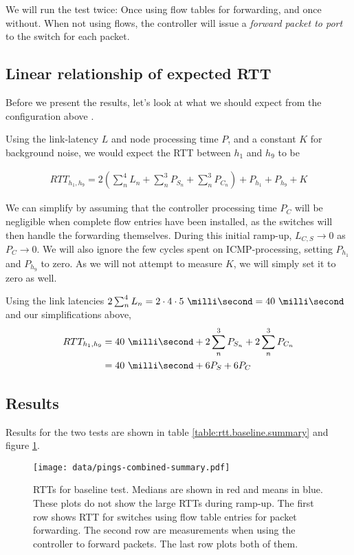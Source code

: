 We will run the test twice: Once using flow tables for forwarding, and once
without.  When not using flows, the controller will issue a \textit{forward
packet to port} to the switch for each packet.

\subsection{Linear relationship of expected \acs{RTT}}

Before we present the results, let's look at what we should expect from the
configuration above \cite{DBLP:conf/cnsm/PhemiusB13}.

Using the link-latency $L$ and node
processing time $P$, and a constant $K$ for
background noise, we would expect the \acf{RTT}
between $h_1$ and $h_9$ to be

\begin{gather}
  RTT_{h_1, h_9} = 2\left( \sum_n^4 L_n + \sum_n^3 P_{S_n} + \sum_n^3 P_{C_n} \right) + P_{h_1} + P_{h_9} + K
  \label{equation:baseline.rtt}
\end{gather}

We can simplify by assuming that the controller processing time $P_C$ will
be negligible when complete flow entries have been installed, as the
switches will then handle the forwarding themselves.  During this initial
ramp-up, $L_{C,S} \to 0$ as $P_C \to 0$.  We will also ignore the few
cycles spent on ICMP-processing, setting $P_{h_1}$ and $P_{h_9}$ to zero.
As we will not attempt to measure $K$, we will simply set it to zero as
well.

Using the link latencies $2\sum_n^4 L_n = 2\cdot4\cdot\ms{5} = \ms{40}$
and our simplifications above,
\begin{align}
  RTT_{h_1,h_9} &= \ms{40} + 2\sum_n^3 P_{S_n} + 2\sum_n^3 P_{C_n} \\
                &= \ms{40} + 6P_S + 6P_C
  \label{equation:expected.baseline.rtt}
\end{align}

\subsection{Results}

Results for the two tests are shown in table
\ref{table:rtt.baseline.summary} and figure
\ref{figure:baseline.combined.summary.plot}.

\begin{figure}
  \centering
  \texttt{[image: data/pings-combined-summary.pdf]}
  \caption{\acs{RTT}s for baseline test.  Medians are shown in red and means
    in blue.
    These plots do not show the large \acs{RTT}s during ramp-up.
    The first row shows \acs{RTT} for switches using flow table entries for
    packet forwarding.  The second row are measurements when using the
    controller to forward packets.  The last row plots both of them.}
  \label{figure:baseline.combined.summary.plot}
\end{figure}

